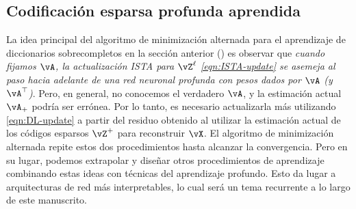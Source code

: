 \documentclass[../../book-main.tex]{subfiles}
\begin{document}
\subsection{Codificación esparsa profunda aprendida}
\label{sec:LISTA}
La idea principal del algoritmo de minimización alternada para
el aprendizaje de diccionarios sobrecompletos en la sección anterior
() es observar que \textit{cuando
    fijamos \(\vA\), la actualización ISTA para $\vZ^\ell$
    \eqref{eqn:ISTA-update} se asemeja
    al paso hacia adelante de una red neuronal profunda con pesos dados
    por \(\vA\) (y
\(\vA^{\top}\))}. Pero, en general, no conocemos el verdadero $\vA$,
y la estimación actual $\vA_+$ podría ser errónea. Por lo tanto, es 
necesario actualizarla más utilizando \eqref{eqn:DL-update} a partir del 
residuo obtenido al utilizar la estimación actual de los
códigos esparsos $\vZ^+$ para reconstruir $\vX$. El algoritmo de minimización alternada
repite estos dos procedimientos hasta alcanzar la convergencia. Pero en su lugar,
podemos extrapolar y diseñar otros procedimientos de aprendizaje combinando
estas ideas con técnicas del aprendizaje profundo. Esto da lugar a arquitecturas 
de red más interpretables, lo cual será un tema recurrente a lo largo de este manuscrito.
\end{document}
